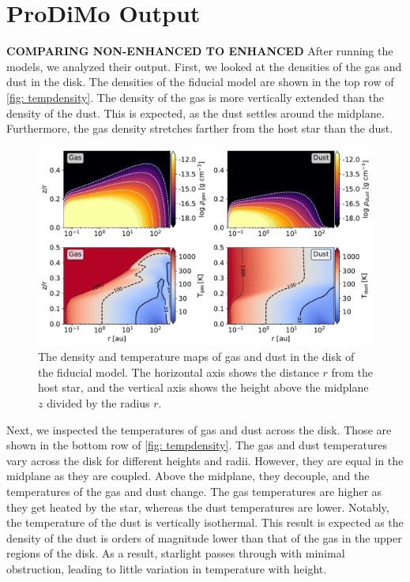\documentclass[twoside, single, authoryear, semicolon, 12pt]{lion-msc}
\newcommand{\4}{$_4$}
\newcommand{\3}{$_3$}
\newcommand{\2}{$_2$}
\begin{document}
\section{ProDiMo Output}
\textbf{COMPARING NON-ENHANCED TO ENHANCED}
After running the models, we analyzed their output. First, we looked at the densities of the gas and dust in the disk. The densities of the fiducial model are shown in the top row of \autoref{fig: tempdensity}. The density of the gas is more vertically extended than the density of the dust. This is expected, as the dust settles around the midplane. Furthermore, the gas density stretches farther from the host star than the dust.

\begin{figure}[!ht]
    \centering
    \includegraphics[width=\linewidth]{Figures/DensityTemperature.pdf}
    \caption{The density and temperature maps of gas and dust in the disk of the fiducial model. The horizontal axis shows the distance $r$ from the host star, and the vertical axis shows the height above the midplane $z$ divided by the radius $r$.}
    \label{fig: tempdensity}
\end{figure}

Next, we inspected the temperatures of gas and dust across the disk. Those are shown in the bottom row of \autoref{fig: tempdensity}.  The gas and dust temperatures vary across the disk for different heights and radii. However, they are equal in the midplane as they are coupled. Above the midplane, they decouple, and the temperatures of the gas and dust change. The gas temperatures are higher as they get heated by the star, whereas the dust temperatures are lower. Notably, the temperature of the dust is vertically isothermal. This result is expected as the density of the dust is orders of magnitude lower than that of the gas in the upper regions of the disk.  As a result, starlight passes through with minimal obstruction, leading to little variation in temperature with height.
\end{document}
